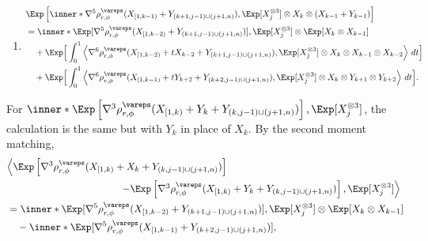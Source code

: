 \documentclass[aos]{imsart}
\begin{document}
\begin{appendix}
\begin{enumerate}
\item \begin{equation*}
\begin{aligned}
    & \Exp\left[ \inner*{
        \nabla^5 \rho_{r,\phi}^\vareps(X_{[1,k-1)} + Y_{(k+1,j-1) \cup (j+1,n)}),
        \Exp[X_j^{\otimes 3}] \otimes X_k \otimes(X_{k-1} + Y_{k-1})
    } \right] \\
    & = \inner*{
        \Exp[ \nabla^5 \rho_{r,\phi}^\vareps(X_{[1,k-2)} + Y_{(k+1,j-1) \cup (j+1,n)}) ],
        \Exp[ X_j^{\otimes 3} ] \otimes \Exp[ X_k \otimes X_{k-1} ]
    } \\
    & \quad + \Exp\Big[ \int_0^1 \Big\langle
        \nabla^6 \rho_{r,\phi}^\vareps(X_{[1,k-2)} + t X_{k-2} + Y_{(k+1,j-1) \cup (j+1,n)}), 
        \Exp[X_j^{\otimes 3}] \otimes X_k \otimes X_{k-1} \otimes X_{k-2}
    \Big\rangle ~dt \Big] \\
    & \quad + \Exp\Big[ \int_0^1 \Big\langle
        \nabla^6 \rho_{r,\phi}^\vareps(X_{[1,k-1)} + t Y_{k+2} + Y_{(k+2,j-1) \cup (j+1,n)}), 
        \Exp[X_j^{\otimes 3}] \otimes X_k \otimes Y_{k+1} \otimes Y_{k+2}
    \Big\rangle ~dt \Big].
\end{aligned}
\end{equation*}
\end{enumerate}
For $\inner*{
    \Exp\left[ \nabla^3 \rho_{r,\phi}^\vareps(X_{[1,k)} + Y_k + Y_{(k,j-1) \cup (j+1,n)}) \right],
    \Exp[X_j^{\otimes 3}]
}$, the calculation is the same but with $Y_k$ in place of $X_k$. By the second moment matching,
\begin{equation*}
\begin{aligned}
    & \Big\langle
        \Exp\left[ \nabla^3 \rho_{r,\phi}^\vareps(X_{[1,k)} + X_k + Y_{(k,j-1) \cup (j+1,n)}) \right] \\ 
    & \omit{\hfill $- \Exp\left[ \nabla^3   \rho_{r,\phi}^\vareps(X_{[1,k)} + Y_k + Y_{(k,j-1) \cup (j+1,n)}) \right], 
        \Exp[ X_j^{\otimes 3} ]
    \Big\rangle$} \\
    & = \inner*{
        \Exp[ \nabla^5 \rho_{r,\phi}^\vareps(X_{[1,k-2)} + Y_{(k+1,j-1) \cup (j+1,n)}) ],
        \Exp[ X_j^{\otimes 3} ] \otimes \Exp[ X_k \otimes X_{k-1} ]
    } \\
    & \quad - \inner*{
        \Exp[ \nabla^5 \rho_{r,\phi}^\vareps(X_{[1,k-1)} + Y_{(k+2,j-1) \cup (j+1,n)}) ],
}
\end{aligned}
\end{equation*}
\end{appendix}
\end{document}
